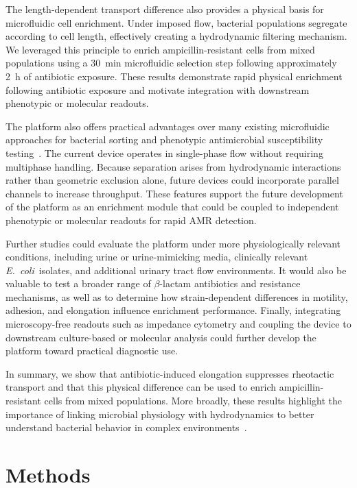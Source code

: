 \documentclass[twoside,twocolumn,9pt]{article}
\newcommand{\ecoli}{{\it E.~coli}}
\begin{document}
    The length-dependent transport difference also provides a physical basis for microfluidic cell enrichment. Under imposed flow, bacterial populations segregate according to cell length, effectively creating a hydrodynamic filtering mechanism. We leveraged this principle to enrich ampicillin-resistant cells from mixed populations using a \SI{30}{\minute} microfluidic selection step following approximately \SI{2}{\hour} of antibiotic exposure. These results demonstrate rapid physical enrichment following antibiotic exposure and motivate integration with downstream phenotypic or molecular readouts.

    The platform also offers practical advantages over many existing microfluidic approaches for bacterial sorting and phenotypic antimicrobial susceptibility testing~\cite{Perez-Rodriguez2022-bg,Zhou2019-gh,Gurung2020-ah,Liu2022-uv,Liu2016-jp,Postek2022-fe}. The current device operates in single-phase flow without requiring multiphase handling. Because separation arises from hydrodynamic interactions rather than geometric exclusion alone, future devices could incorporate parallel channels to increase throughput. These features support the future development of the platform as an enrichment module that could be coupled to independent phenotypic or molecular readouts for rapid AMR detection.

    Further studies could evaluate the platform under more physiologically relevant conditions, including urine or urine-mimicking media, clinically relevant \ecoli\ isolates, and additional urinary tract flow environments. It would also be valuable to test a broader range of $\beta$-lactam antibiotics and resistance mechanisms, as well as to determine how strain-dependent differences in motility, adhesion, and elongation influence enrichment performance. Finally, integrating microscopy-free readouts such as impedance cytometry and coupling the device to downstream culture-based or molecular analysis could further develop the platform toward practical diagnostic use.
    
    In summary, we show that antibiotic-induced elongation suppresses rheotactic transport and that this physical difference can be used to enrich ampicillin-resistant cells from mixed populations. More broadly, these results highlight the importance of linking microbial physiology with hydrodynamics to better understand bacterial behavior in complex environments~\cite{Persat2015-rl,Guasto2012-da,Aranson2022-lz}.

\section*{Methods}
\end{document}
